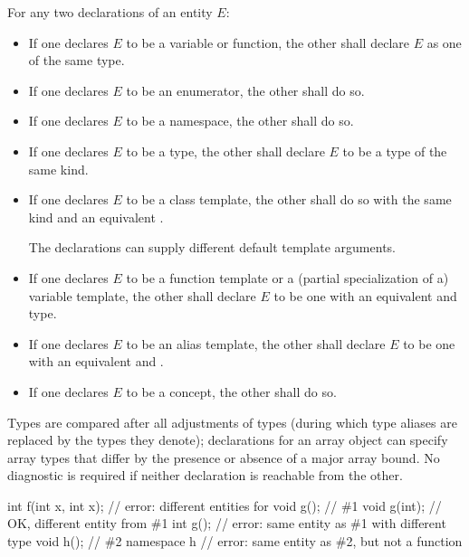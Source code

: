 \pnum
{}%
%
For any two declarations of an entity $E$:
\begin{itemize}
\item
If one declares $E$ to be a variable or function,
the other shall declare $E$ as one of the same type.
\item
If one declares $E$ to be an enumerator, the other shall do so.
\item
If one declares $E$ to be a namespace, the other shall do so.
\item
If one declares $E$ to be a type,
the other shall declare $E$ to be a type of the same kind.
\item
If one declares $E$ to be a class template,
the other shall do so with the same kind and
an equivalent .
\begin{note}
The declarations can supply different default template arguments.
\end{note}
\item
If one declares $E$ to be a function template or
a (partial specialization of a) variable template,
the other shall declare $E$ to be one
with an equivalent  and type.
\item
If one declares $E$ to be an alias template,
the other shall declare $E$ to be one with
an equivalent  and .
\item
If one declares $E$ to be a concept, the other shall do so.
\end{itemize}
Types are compared after all adjustments of types (during which
type aliases are replaced by the types they denote);
declarations for an array
object can specify array types that differ by the presence or absence of
a major array bound.
No diagnostic is required
if neither declaration is reachable from the other.
\begin{example}
\begin{codeblock}
int f(int x, int x);    // error: different entities for 
void g();               // \#1
void g(int);            // OK, different entity from \#1
int g();                // error: same entity as \#1 with different type
void h();               // \#2
namespace h {}          // error: same entity as \#2, but not a function
\end{codeblock}
\end{example}

